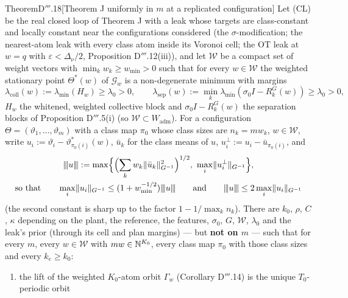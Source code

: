 \begin{thm}{Theorem}{D$'''$.18}[Theorem J uniformly in $m$ at a replicated configuration]
Let \textup{(CL)} be the real closed loop of Theorem J with a leak whose targets are class-constant and locally
constant near the configurations considered (the $\sigma$-modification; the nearest-atom leak with every class atom
inside its Voronoi cell; the OT leak at $w = q$ with $\varepsilon < \Delta_\nu/2$, Proposition D$'''$.12(iii)), and
let $\mathcal{W}$ be a compact set of weight vectors with $\min_kw_k\ge w_{\min} > 0$ such that for every
$w\in\mathcal{W}$ the weighted stationary point $\Theta^*(w)$ of $\mathcal{G}_w$ is a non-degenerate minimum with
margins
\[
  \lambda_{\mathrm{coll}}(w) := \lambda_{\min}(H_w)\ge\lambda_0 > 0,\qquad
  \lambda_{\mathrm{sep}}(w) := \min_k\lambda_{\min}(\sigma_0I - R^G_k(w))\ge\lambda_0 > 0,
\]
$H_w$ the whitened, weighted collective block and $\sigma_0I - R^G_k(w)$ the separation blocks of Proposition
D$'''$.5(i) (so $\mathcal{W}\subset W_{\mathrm{adm}}$). For a configuration $\Theta = (\vartheta_1,\dots,\vartheta_m)$
with a class map $\pi_0$ whose class sizes are $n_k = mw_k$, $w\in\mathcal{W}$, write
$u_i := \vartheta_i - \vartheta^*_{\pi_0(i)}(w)$, $\bar u_k$ for the class means of $u$,
$u_i^\perp := u_i - \bar u_{\pi_0(i)}$, and
\begin{gather*}
  \lvert\kern-0.25ex\lvert\kern-0.25ex\lvert u\rvert\kern-0.25ex\rvert\kern-0.25ex\rvert := \max\Bigl\{\Bigl(\sum_kw_k\lVert \bar u_k\rVert^2_{G^{-1}}\Bigr)^{1/2},\ \max_i\lVert u_i^\perp\rVert_{G^{-1}}\Bigr\},\\
  \text{so that}\qquad\max_i\lVert u_i\rVert_{G^{-1}}\le(1 + w_{\min}^{-1/2})\lvert\kern-0.25ex\lvert\kern-0.25ex\lvert u\rvert\kern-0.25ex\rvert\kern-0.25ex\rvert\qquad\text{and}\qquad
  \lvert\kern-0.25ex\lvert\kern-0.25ex\lvert u\rvert\kern-0.25ex\rvert\kern-0.25ex\rvert\le2\max_i\lVert u_i\rVert_{G^{-1}}
\end{gather*}
(the second constant is sharp up to the factor $1 - 1/\max_kn_k$). There are $k_0$, $\rho$, $C$, $\kappa$ depending
on the plant, the reference, the features, $\sigma_0$, $G$, $\mathcal{W}$, $\lambda_0$ and the leak's prior (through
its cell and plan margins) --- but \textbf{not on $m$} --- such that for every $m$, every $w\in\mathcal{W}$ with
$mw\in\mathbb{N}^{K_0}$, every class map $\pi_0$ with those class sizes and every $k_e\ge k_0$:
\begin{enumerate}[label=\textup{(\alph*)}]
  \item the lift of the weighted $K_0$-atom orbit $\Gamma_w$ (Corollary D$'''$.14) is the unique $T_0$-periodic orbit

\end{enumerate}
\end{thm}
